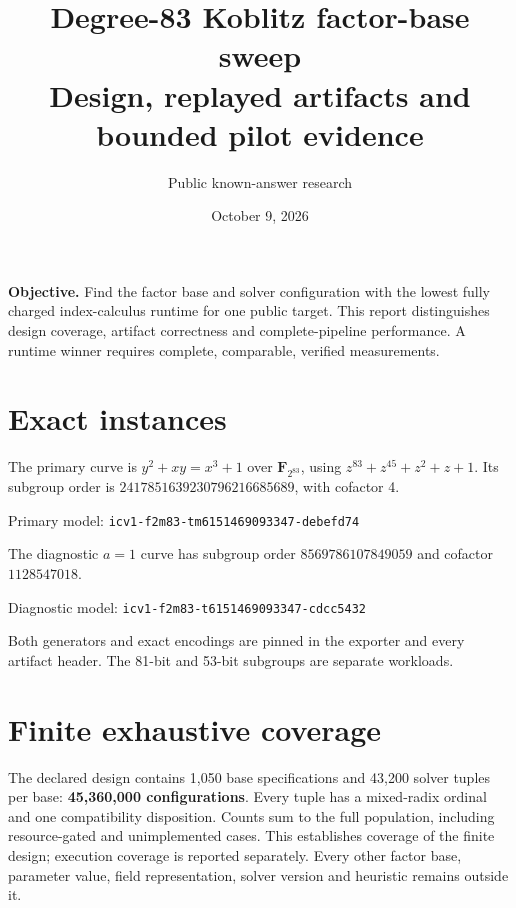 \documentclass[11pt]{article}
\title{Degree-83 Koblitz factor-base sweep\\Design, replayed artifacts and bounded pilot evidence}
\author{Public known-answer research}
\date{October 9, 2026}
\begin{document}
\maketitle
\textbf{Objective.} Find the factor base and solver configuration with the lowest fully charged index-calculus runtime for one public target. This report distinguishes design coverage, artifact correctness and complete-pipeline performance. A runtime winner requires complete, comparable, verified measurements.

\section*{Exact instances}
The primary curve is $y^2+xy=x^3+1$ over $\mathbf F_{2^{83}}$, using $z^{83}+z^{45}+z^2+z+1$. Its subgroup order is $2417851639230796216685689$, with cofactor 4.

{\small Primary model: \texttt{icv1-f2m83-tm6151469093347-debefd74}\par}

The diagnostic $a=1$ curve has subgroup order $8569786107849059$ and cofactor $1128547018$.

{\small Diagnostic model: \texttt{icv1-f2m83-t6151469093347-cdcc5432}\par}

Both generators and exact encodings are pinned in the exporter and every artifact header. The 81-bit and 53-bit subgroups are separate workloads.

\section*{Finite exhaustive coverage}
The declared design contains 1,050 base specifications and 43,200 solver tuples per base: \textbf{45,360,000 configurations}. Every tuple has a mixed-radix ordinal and one compatibility disposition. Counts sum to the full population, including resource-gated and unimplemented cases. This establishes coverage of the finite design; execution coverage is reported separately. Every other factor base, parameter value, field representation, solver version and heuristic remains outside it.
\end{document}
